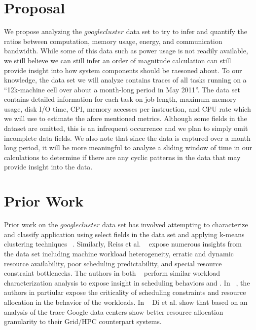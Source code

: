 \documentclass{article}
\begin{document}

\section{Proposal}

We propose analyzing the $googlecluster$ data set to try to infer and quantify the ratios between computation, memory usage, energy, and communication bandwidth. 
While some of this data such as power usage is not readily available, we still believe we can still infer an order of magnitude calculation can still provide insight into how system components should be raesoned about.
To our knowledge, the data set we will analyze contains traces of all tasks running on a ``12k-machine cell over about a month-long period in May 2011''.
The data set contains detailed information for each task on job length, maximum memory usage, disk I/O time, CPI, memory accesses per instruction, and CPU rate which we will use to estimate the afore mentioned metrics.
Although some fields in the dataset are omitted, this is an infrequent occurrence and we plan to simply omit incomplete data fields.
We also note that since the data is captured over a month long period, it will be more meaningful to analyze a sliding window of time in our calculations to determine if there are any cyclic patterns in the data that may provide insight into the data.


\section{Prior Work}

Prior work on the $googlecluster$ data set has involved attempting to characterize and classify application using select fields in the data set and applying k-means clustering techniques ~\cite{clusterdata:Di2013, clusterdata:Mishra2010}.
Similarly, Reiss et al. ~\cite{clusterdata:Reiss2012b} expose numerous insights from the data set including machine workload heterogeneity, erratic and dynamic resource availability, poor scheduling predictability, and special resource constraint bottlenecks.
The authors in both ~\cite{clusterdata:Liu2012, clusterdata:Mishra2010} perform similar workload characterization analysis to expose insight in scheduling behaviors and .
In ~\cite{clusterdata:Lui2012}, the authors in partiular expose the criticality of scheduling constraints and resource allocation in the behavior of the workloads.
In ~\cite{clusterdata:Di2012a} Di et al. show that based on an analysis of the trace Google data centers show better resource allocation granularity to their Grid/HPC counterpart systems.
\end{document}
